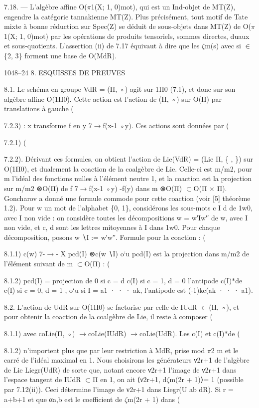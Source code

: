 \documentclass[11pt]{article}
\begin{document}
7.18. --- L’algèbre affine O(\(\pi\)1(X; 1, 0)mot), qui est un Ind-objet de MT(Z), engendre la catégorie tannakienne MT(Z). Plus précisément, tout motif de Tate mixte à bonne réduction sur Spec(Z) se déduit de sous-objets dans MT(Z) de O(\(\pi\)1(X; 1, 0)mot) par les opérations de produits tensoriels, sommes directes, duaux et sous-quotients. L’assertion (ii) de 7.17 équivaut à dire que les \(\zeta\)m(s) avec si \(\in\)\{2, 3\} forment une base de O(MdR).

1048--24 8. ESQUISSES DE PREUVES 

8.1. Le schéma en groupe VdR = (Π, ◦) agit sur 1Π0 (7.1), et donc sur son algèbre affine O(1Π0). Cette action est l’action de (Π, ◦) sur O(Π) par translations à gauche (

7.2.3) : x transforme f en y 7\(\to\)f(x-1 ◦y). Ces actions sont données par (

7.2.1) (

7.2.2). Dérivant ces formules, on obtient l’action de Lie(VdR) = (Lie Π, \{ , \}) sur O(1Π0), et dualement la coaction de la coalgèbre de Lie. Celle-ci est m/m2, pour m l’idéal des fonctions nulles à l’élément neutre 1, et la coaction est la projection sur m/m2 ⊗O(Π) de f 7\(\to\)f(x-1 ◦y) -f(y) dans m ⊗O(Π) \(\subset\)O(Π × Π). Goncharov a donné une formule commode pour cette coaction (voir [5] théorème 1.2). Pour w un mot de l’alphabet \{0, 1\}, considérons les sous-mots c I d de 1w0, avec I non vide : on considère toutes les décompositions w = w′Iw′′ de w, avec I non vide, et c, d sont les lettres mitoyennes à I dans 1w0. Pour chaque décomposition, posons w ∖I := w′w′′. Formule pour la coaction : (

8.1.1) c(w) 7-\(\to\)- X pcd(I) ⊗c(w ∖I) o`u pcd(I) est la projection dans m/m2 de l’élément suivant de m \(\subset\)O(Π) : (

8.1.2) pcd(I) = projection de        0 si c = d c(I) si c = 1, d = 0 l’antipode c(I)\(*\)de c(I) si c = 0, d = 1 , o`u si I = a1 · · · ak, l’antipode est (-1)kc(ak · · · a1). 

8.2. L’action de UdR sur O(1Π0) se factorise par celle de IUdR \(\subset\)(Π, ◦), et pour obtenir la coaction de la coalgèbre de Lie, il reste à composer (

8.1.1) avec coLie(Π, ◦) \(\to\)coLie(IUdR) \(\to\)coLie(UdR). Les c(I) et c(I)\(*\)de (

8.1.2) n’importent plus que par leur restriction à MdR, prise mod \(\pi\)2 m et le carré de l’idéal maximal en 1. Nous choisirons les générateurs ν2r+1 de l’algèbre de Lie Liegr(UdR) de sorte que, notant encore ν2r+1 l’image de ν2r+1 dans l’espace tangent de IUdR \(\subset\)Π en 1, on ait ⟨ν2r+1, d\(\zeta\)m(2r + 1)⟩= 1 (possible par 7.12(ii)). Ceci détermine l’image de ν2r+1 dans Liegr(U ab dR). Si r = a+b+1 et que αa,b est le coefficient de \(\zeta\)m(2r + 1) dans (
\end{document}
